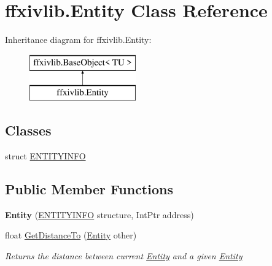 \hypertarget{classffxivlib_1_1_entity}{\section{ffxivlib.\-Entity Class Reference}
\label{classffxivlib_1_1_entity}
}
Inheritance diagram for ffxivlib.\-Entity\-:\begin{figure}[H]
\begin{center}
\leavevmode
\includegraphics[height=2.000000cm]{classffxivlib_1_1_entity}
\end{center}
\end{figure}
\subsection*{Classes}
\begin{DoxyCompactItemize}
\item 
struct \hyperlink{structffxivlib_1_1_entity_1_1_e_n_t_i_t_y_i_n_f_o}{E\-N\-T\-I\-T\-Y\-I\-N\-F\-O}
\end{DoxyCompactItemize}
\subsection*{Public Member Functions}
\begin{DoxyCompactItemize}
\item 
\hypertarget{classffxivlib_1_1_entity_adb213479edb67da5f95f3d0197285f87}{{\bfseries Entity} (\hyperlink{structffxivlib_1_1_entity_1_1_e_n_t_i_t_y_i_n_f_o}{E\-N\-T\-I\-T\-Y\-I\-N\-F\-O} structure, Int\-Ptr address)}\label{classffxivlib_1_1_entity_adb213479edb67da5f95f3d0197285f87}

\item 
float \hyperlink{classffxivlib_1_1_entity_a990f9fe0b9053251c82e53879acd0c69}{Get\-Distance\-To} (\hyperlink{classffxivlib_1_1_entity}{Entity} other)
\begin{DoxyCompactList}\small\item\em Returns the distance between current \hyperlink{classffxivlib_1_1_entity}{Entity} and a given \hyperlink{classffxivlib_1_1_entity}{Entity} \end{DoxyCompactList}\end{DoxyCompactItemize}
